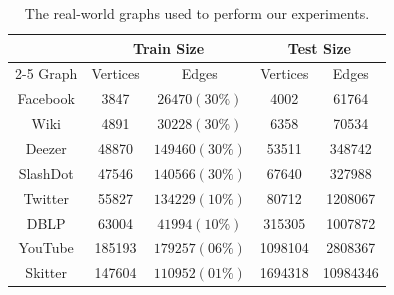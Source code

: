 
\begin{table}[h]
\centering
\caption{The real-world graphs used to perform our experiments. 
}

\vspace{1em}
\begin{tabular}{|c|c|c|c|c|}
\hline
         & \multicolumn{2}{c|}{Train Size}        & \multicolumn{2}{c|}{Test Size}           \\ \cline{2-5} 
Graph    & \multicolumn{1}{c|}{Vertices} & Edges  & \multicolumn{1}{c|}{Vertices} & Edges    \\ \hline
Facebook & 3847                          & $26470 (30\%)$  & 4002                          & 61764    \\
Wiki     & 4891                          & $30228 (30\%)$  & 6358                          & 70534    \\
Deezer   & 48870                         & $149460 (30\%)$& 53511                         & 348742   \\
SlashDot & 47546                         & $140566 (30\%)$& 67640                         & 327988   \\
Twitter  & 55827                         & $134229 (10\%)$& 80712                         & 1208067  \\
DBLP     & 63004                         & $41994 (10\%)$ & 315305                        & 1007872  \\
YouTube  & 185193                        & $179257 (06\%)$ & 1098104                       & 2808367  \\
Skitter  & 147604                        & $110952 (01\%)$ & 1694318                       & 10984346 \\ \hline
\end{tabular}

\label{tab:dataset_distribution}
\end{table}



